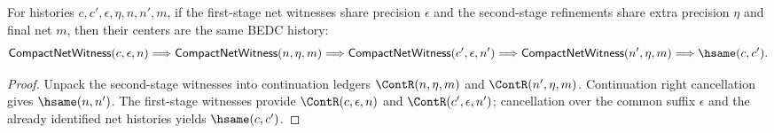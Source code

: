 \begin{theorem}
\label{thm:compact-net-witness-composite-center-deterministic}
For histories $c,c',\epsilon,\eta,n,n',m$, if the first-stage net witnesses
share precision $\epsilon$ and the second-stage refinements share extra
precision $\eta$ and final net $m$, then their centers are the same BEDC
history:
$$
\mathsf{CompactNetWitness}(c,\epsilon,n)
\Longrightarrow
\mathsf{CompactNetWitness}(n,\eta,m)
\Longrightarrow
\mathsf{CompactNetWitness}(c',\epsilon,n')
\Longrightarrow
\mathsf{CompactNetWitness}(n',\eta,m)
\Longrightarrow
\hsame(c,c').
$$
\end{theorem}
\begin{proof}
Unpack the second-stage witnesses into continuation ledgers
$\ContR(n,\eta,m)$ and $\ContR(n',\eta,m)$. Continuation right cancellation
gives $\hsame(n,n')$. The first-stage witnesses provide
$\ContR(c,\epsilon,n)$ and $\ContR(c',\epsilon,n')$; cancellation over the
common suffix $\epsilon$ and the already identified net histories yields
$\hsame(c,c')$.
\end{proof}
